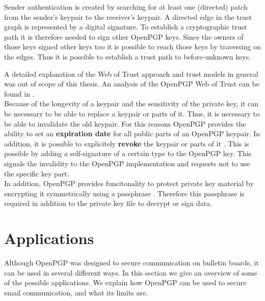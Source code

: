 Sender authentication is created by searching for at least one (directed) patch from the sender's keypair to the receiver's keypair. A directed edge in the trust graph is represented by a digital signature. To establish a cryptographic trust path it is therefore needed to sign other OpenPGP keys. Since the owners of those keys signed other keys too it is possible to reach those keys by traversing on the edges. Thus it is possible to establish a trust path to before-unknown keys.

A detailed explanation of the Web of Trust approach and trust models in general was out of scope of this thesis. An analysis of the OpenPGP Web of Trust can be found in \cite{Ulrich2011}. \\


Because of the longevity of a keypair and the sensitivity of the private key, it can be necessary to be able to replace a keypair or parts of it. Thus, it is necessary to be able to invalidate the old keypair. For this reasons OpenPGP provides the ability to set an \textbf{expiration date} for all public parts of an OpenPGP keypair. In addition, it is possible to explicitely \textbf{revoke} the keypair or parts of it \cite[section 5.2]{RFC4880}. This is possible by adding a self-signature of a certain type to the OpenPGP key. This signals the invalidity to the OpenPGP implementation and requests not to use the specific key part. \\


In addition, OpenPGP provides funcitonality to protect private key material by encrypting it symmetrically using a passphrase \cite[section 3.7]{RFC4880}. Therefore this passphrase is required in addition to the private key file to decrypt or sign data.

\section{Applications} \label{section:openpgp:applications}

Although OpenPGP was designed to secure communication on bulletin boards, it can be used in several different ways. In this section we give an overview of some of the possible applications. We explain how OpenPGP can be used to secure email communication, and what its limits are.  \\


